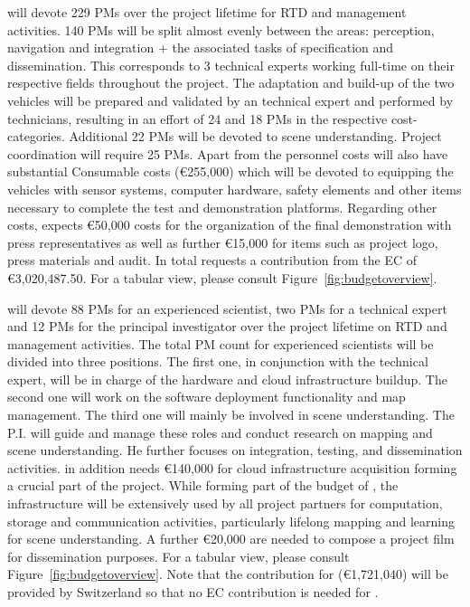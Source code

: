 \VW will devote 229 PMs over the project lifetime for RTD and management activities. 140 PMs will be split almost evenly between the areas: perception, navigation and integration + the associated tasks of specification and dissemination. This corresponds to 3 technical experts working full-time on their respective fields throughout the project. The adaptation and build-up of the two vehicles will be prepared and validated by an technical expert and performed by technicians, resulting in an effort of 24 and 18 PMs in the respective cost-categories. Additional 22 PMs will be devoted to scene understanding. Project coordination will require 25 PMs. Apart from the personnel costs \VW will also have substantial Consumable costs (\euro 255,000) which will be devoted to equipping the vehicles with sensor systems, computer hardware, safety elements and other items necessary to complete the test and demonstration platforms. Regarding other costs, \VW expects \euro 50,000 costs for the organization of the final demonstration with press representatives as well as further \euro 15,000 for items such as project logo, press materials and audit. In total \VW requests a contribution from the EC of \euro 3,020,487.50. For a tabular view, please consult Figure~\ref{fig:budgetoverview}.

\IBM will devote 88 PMs for an experienced scientist, two PMs for a technical expert and 12 PMs for the principal investigator over the project lifetime on RTD and management activities.
The total PM count for experienced scientists will be divided into three positions. The first one, in conjunction with the technical expert, will be in charge of the hardware and cloud infrastructure buildup. The second one will work on the software deployment functionality and map management. The third one will mainly be involved in scene understanding. The P.I. will guide and manage these roles and conduct research on mapping and scene understanding. He further focuses on integration, testing, 
and dissemination activities. \IBM in addition needs \euro 140,000 for cloud infrastructure acquisition forming a crucial part of the project. While forming part of the budget of \IBM, the infrastructure will be extensively used by all project partners for computation, storage and communication activities, particularly lifelong mapping and learning for scene understanding. A further \euro 20,000 are needed to compose a project film for dissemination purposes. For a tabular view, please consult Figure~\ref{fig:budgetoverview}. Note that the contribution for \IBM (\euro 1,721,040) will be provided by Switzerland so that no EC contribution is needed for \IBM. 

